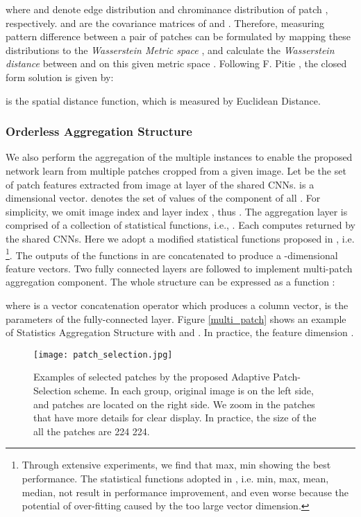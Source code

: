 \documentclass[10pt,twocolumn,letterpaper]{article}
\begin{document}
	where  and  denote edge distribution and chrominance distribution of patch , respectively.  and  are the covariance matrices of  and . Therefore, measuring pattern difference between a pair of patches can be formulated by mapping these distributions  to the \textit{Wasserstein Metric space} ,  and calculate the \textit{ Wasserstein distance} between  and  on this given metric space .
	Following F. Pitie \cite{F.Pitie:2007:color_transfer}, the closed form solution is given by: 
	
	 is the spatial distance function, which is measured by Euclidean Distance.
	
	\subsubsection{Orderless Aggregation Structure}
	We also perform the aggregation of the multiple instances to enable the proposed network learn from multiple patches cropped from a given image. Let  be the set of patch features extracted from  image 
	at  layer of the shared CNNs.  is a  dimensional vector.
	 denotes the set of values of the  component of all . For simplicity, we omit image index  and layer index , thus .
	The aggregation layer is comprised of a collection of statistical functions, 
	i.e., . Each  computes
	 returned by the shared CNNs. Here we adopt a modified statistical functions proposed in \cite{Lu:2015:ICCV}, i.e. \footnote[1]{Through extensive experiments, we find that {max, min} showing the best performance. The statistical functions adopted in \cite{Lu:2015:ICCV}, i.e. {min, max, mean, median}, not result in performance improvement, and even worse because the potential of over-fitting caused by the too large vector dimension.}. The outputs of the functions in  are concatenated to produce a -dimensional feature vectors. Two fully connected layers are followed to implement multi-patch
	aggregation component. The whole structure can be expressed as a function 
	:
	
	where  is a vector concatenation operator which produces a column vector,  is the parameters of the fully-connected layer. 
	Figure \ref{multi_patch} shows an example of Statistics Aggregation Structure with  and . In practice, the feature dimension .
	
	\begin{figure}
		\centering
		\texttt{[image: patch\_selection.jpg]}
		\caption{Examples of selected patches by the proposed Adaptive Patch-Selection scheme. In each group, original image is on the left side, and patches are located on the right side. We zoom in the patches that have more details for clear display. In practice, the size of the all the patches are 224  224. }
		\label{patches}
		\vspace{-3mm}
	\end{figure}
\end{document}
